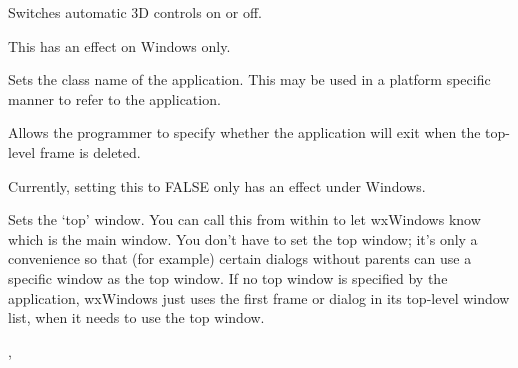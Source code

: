 

\label{wxappsetauto3d}


Switches automatic 3D controls on or off.




This has an effect on Windows only.



\label{wxappsetclassname}


Sets the class name of the application. This may be used in a platform specific
manner to refer to the application.



\label{wxappsetexitondelete}


Allows the programmer to specify whether the application will exit when the
top-level frame is deleted.




Currently, setting this to FALSE only has an effect under Windows.

\label{wxappsettopwindow}


Sets the `top' window. You can call this from within  to
let wxWindows know which is the main window. You don't have to set the top window;
it's only a convenience so that (for example) certain dialogs without parents can use a
specific window as the top window. If no top window is specified by the application,
wxWindows just uses the first frame or dialog in its top-level window list, when it
needs to use the top window.




, 

